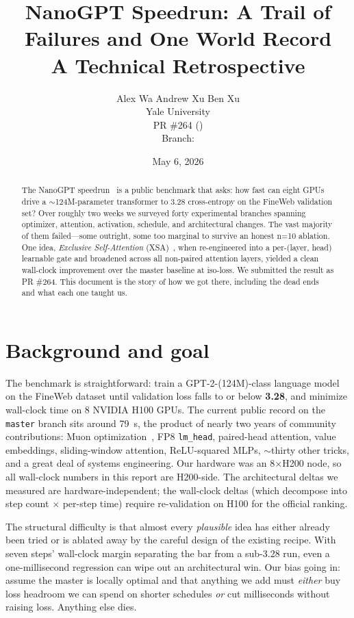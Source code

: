 \documentclass[10pt,letterpaper]{article}
\title{\vspace{-2em}\Large\bf NanoGPT Speedrun: A Trail of Failures and One World Record\\[0.2em]
\large A Technical Retrospective}
\author{
  Alex Wa \quad Andrew Xu \quad Ben Xu\\[0.4em]
  \normalsize Yale University\\
  \normalsize PR \#264 (\href{https://github.com/KellerJordan/modded-nanogpt/pull/264}{\code{KellerJordan/modded-nanogpt\#264}})\\
  \normalsize Branch: \href{https://github.com/djdumpling/modded-nanogpt/tree/xsa-gated-layers}{\code{xsa-gated-layers}}
}
\date{May 6, 2026}
\newcommand{\code}[1]{\texttt{\small #1}}
\newcommand{\val}[1]{\textbf{#1}}
\begin{document}
\maketitle
\vspace{-2em}

\begin{abstract}
\noindent
The NanoGPT speedrun~\cite{jordan_modded_nanogpt} is a public benchmark that asks: how fast can eight GPUs drive a $\sim$124M-parameter transformer to 3.28 cross-entropy on the FineWeb validation set? Over roughly two weeks we surveyed forty experimental branches spanning optimizer, attention, activation, schedule, and architectural changes. The vast majority of them failed---some outright, some too marginal to survive an honest n=10 ablation. One idea, \emph{Exclusive Self-Attention} (XSA)~\cite{xsa_zhai}, when re-engineered into a per-(layer, head) learnable gate and broadened across all non-paired attention layers, yielded a clean wall-clock improvement over the master baseline at iso-loss. We submitted the result as PR \#264. This document is the story of how we got there, including the dead ends and what each one taught us.
\end{abstract}

\vspace{-0.5em}

\section{Background and goal}
\label{sec:bg}

The benchmark is straightforward: train a GPT-2-(124M)-class language model on the FineWeb dataset until validation loss falls to or below \val{3.28}, and minimize wall-clock time on 8 NVIDIA H100 GPUs. The current public record on the \code{master} branch sits around 79~s, the product of nearly two years of community contributions: Muon optimization~\cite{muon_jordan}, FP8 \code{lm\_head}, paired-head attention, value embeddings, sliding-window attention, ReLU-squared MLPs, $\sim$thirty other tricks, and a great deal of systems engineering. Our hardware was an 8\(\times\)H200 node, so all wall-clock numbers in this report are H200-side. The architectural deltas we measured are hardware-independent; the wall-clock deltas (which decompose into step count $\times$ per-step time) require re-validation on H100 for the official ranking.

The structural difficulty is that almost every \emph{plausible} idea has either already been tried or is ablated away by the careful design of the existing recipe. With seven steps' wall-clock margin separating the bar from a sub-3.28 run, even a one-millisecond regression can wipe out an architectural win. Our bias going in: assume the master is locally optimal and that anything we add must \emph{either} buy loss headroom we can spend on shorter schedules \emph{or} cut milliseconds without raising loss. Anything else dies.
\end{document}
